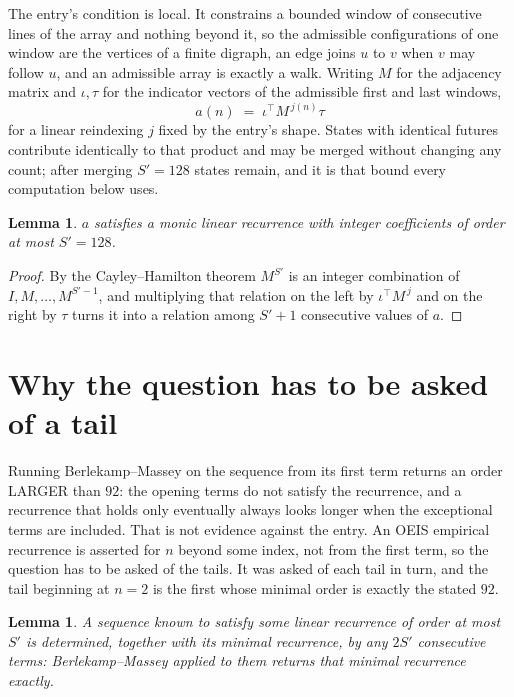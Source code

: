 \documentclass[11pt,a4paper]{article}
\theoremstyle{plain}
\newtheorem{lemma}[theorem]{Lemma}
\theoremstyle{definition}
\begin{document}
The entry's condition is local. It constrains a bounded window of consecutive lines of the
array and nothing beyond it, so the admissible configurations of one window are the vertices of
a finite digraph, an edge joins $u$ to $v$ when $v$ may follow $u$, and an admissible array is
exactly a walk. Writing $M$ for the adjacency matrix and $\iota,\tau$ for the indicator vectors
of the admissible first and last windows,
\[
a(n)\;=\;\iota^{\!\top}M^{\,j(n)}\tau
\]
for a linear reindexing $j$ fixed by the entry's shape. States with identical futures
contribute identically to that product and may be merged without changing any count; after
merging $S'=128$ states remain, and it is that bound every computation below uses.

\begin{lemma}\label{lem:cf}
$a$ satisfies a monic linear recurrence with integer coefficients of order at most $S'=128$.
\end{lemma}

\begin{proof}
By the Cayley--Hamilton theorem $M^{S'}$ is an integer combination of $I,M,\dots,M^{S'-1}$,
and multiplying that relation on the left by $\iota^{\!\top}M^{\,j}$ and on the right by
$\tau$ turns it into a relation among $S'+1$ consecutive values of $a$.
\end{proof}

\section{Why the question has to be asked of a tail}

Running Berlekamp--Massey on the sequence from its first term returns an order LARGER than $92$: the opening terms do not satisfy the recurrence, and a recurrence that holds only eventually always looks longer when the exceptional terms are included. That is not evidence against the entry. An OEIS empirical recurrence is asserted for $n$ beyond some index, not from the first term, so the question has to be asked of the tails. It was asked of each tail in turn, and the tail beginning at $n=2$ is the first whose minimal order is exactly the stated $92$.

\begin{lemma}\label{lem:bm}
A sequence known to satisfy some linear recurrence of order at most $S'$ is determined,
together with its minimal recurrence, by any $2S'$ consecutive terms: Berlekamp--Massey applied
to them returns that minimal recurrence exactly.
\end{lemma}
\end{document}

